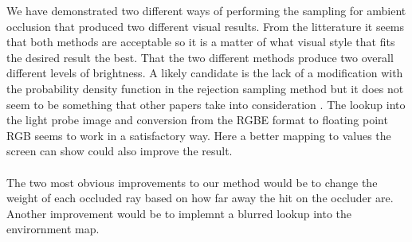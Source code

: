 We have demonstrated two different ways of performing the sampling for ambient occlusion that produced two different visual results. From the litterature it seems that both methods are acceptable so it is a matter of what visual style that fits the desired result the best. That the two different methods produce two overall different levels of brightness. A likely candidate is the lack of a modification with the probability density function in the rejection sampling method but it does not seem to be something that other papers take into consideration \cite{Gems17}. The lookup into the light probe image and conversion from the RGBE format to floating point RGB seems to work in a satisfactory way. Here a better mapping to values the screen can show could also improve the result.
\\ \\
The two most obvious improvements to our method would be to change the weight of each occluded ray based on how far away the hit on the occluder are. Another improvement would be to implemnt a blurred lookup into the envirornment map.